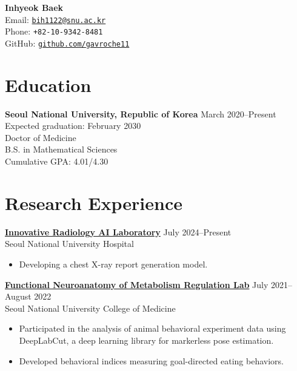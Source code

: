 \documentclass[11pt, a4paper]{article}
\newenvironment{customitemize}
	{\begin{itemize}[leftmargin=*, noitemsep, topsep=0pt, label=$\cdot$]}
	{\end{itemize}}
\begin{document}
\begin{center}
    \textbf{\Large Inhyeok Baek}\\
    \vspace{0.5mm}
    Email: \href{mailto:bih1122@snu.ac.kr}{\texttt{bih1122@snu.ac.kr}} \\
    Phone: \texttt{+82-10-9342-8481} \\
    GitHub: \href{https://github.com/gavroche11}{\texttt{github.com/gavroche11}} \\
\end{center}

\section*{Education}
\textbf{Seoul National University, Republic of Korea} \hfill March 2020--Present \\
\null\hfill {Expected graduation: February 2030}\smallskip \\
Doctor of Medicine\\
B.S. in Mathematical Sciences\\
Cumulative GPA: 4.01/4.30

\section*{Research Experience}
\href{http://irail.snu.ac.kr}{\textbf{Innovative Radiology AI Laboratory}} \hfill July 2024--Present\\
Seoul National University Hospital \smallskip
\begin{customitemize}
    \item Developing a chest X-ray report generation model.
\end{customitemize}
\bigskip
\href{https://fnmr.snu.ac.kr/}{\textbf{Functional Neuroanatomy of Metabolism Regulation Lab}} \hfill July 2021--August 2022\\
Seoul National University College of Medicine \smallskip
\begin{customitemize}
    \item \sloppy Participated in the analysis of animal behavioral experiment data using DeepLabCut, a deep learning library for markerless pose estimation.
    \item Developed behavioral indices measuring goal-directed eating behaviors.
\end{customitemize}

\end{document}
